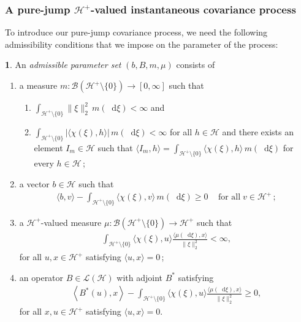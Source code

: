 \documentclass[10pt,a4paper,reqno]{amsart}
\makeatletter
\newcommand*\D{\mathop{}\!\mathrm{d}}
\numberwithin{equation}{section}
\theoremstyle{plain}
\theoremstyle{definition}
\theoremstyle{example}
\newtheorem*{assumption*}{\assumptionnumber}
\providecommand{\assumptionnumber}{}
\newenvironment{assumption}[2]
 {%
  \renewcommand{\assumptionnumber}{Assumption #1$\mathfrak{#2}$}%
  \begin{assumption*}%
  \protected@edef\@currentlabel{#1$
  \mathfrak{#2}$}%
 }
 {%
  \end{assumption*}
 }
\newcommand{\cB}{\mathcal{B}}
\newcommand{\cH}{\mathcal{H}}
\newcommand{\cHplus}{\cH^{+}}
\newcommand{\cHpluso}{\cHplus\setminus \{0\}}
\newcommand{\dm}{m(\D\xi)}
\newcommand{\dmu}{\mu(\D\xi)}
\makeatother
\begin{document}
\subsubsection{A pure-jump $\cH^+$-valued instantaneous covariance process}
To introduce our pure-jump covariance process, we need the following admissibility conditions that we impose on the parameter of the process:
\begin{assumption}{}{A}\label{def:admissibility}
 An \emph{admissible parameter set}
$(b, B, m, \mu)$ %
consists of
\begin{enumerate}
\item[(i)] \label{eq:m-2moment} a measure $m\colon\cB(\cHpluso)\to [0,\infty]$ such that
    \begin{enumerate}
    \item[(a)] $\int_{\cHpluso} \| \xi \|_2^2 \,\dm < \infty$ and
    \item[(b)] $\int_{\cHpluso}|\langle\chi(\xi),h\rangle|\,\dm<\infty$ for all $h\in\cH$  
   and there exists an element $I_{m}\in \cH$ such that $\langle
   I_{m},h\rangle=\int_{\cHpluso}\langle \chi(\xi),h\rangle\, m(\D\xi)$ for every $h\in\cH$\,;
 \end{enumerate}   
\item[(ii)]\label{eq:drift} a vector $b\in\cH$ such that
  \begin{align}\label{ass:b_positive}
    \langle b, v\rangle - \int_{\cHpluso} \langle \chi(\xi), v\rangle\,m(\D\xi) \geq 0\, \quad\text{for all}\;v\in\cHplus\,;
  \end{align}
\item[(iii)] \label{eq:affine-kernel} a $\cH^{+}$-valued measure 
$\mu \colon \mathcal{B}(\cHpluso) \rightarrow \cH^+$ such that
\begin{align*}
\int_{\cH^+\setminus \{0\}} \langle \chi(\xi), u\rangle \frac{\langle \dmu, x \rangle}{\| \xi \|_2^2 }< \infty,  
\end{align*}
for all $u,x\in \cH^{+}$ satisfying $\langle u,x \rangle = 0$\,;
 \item[(iv)] \label{eq:linear-operator} an operator $B\in \mathcal{L}(\mathcal{H})$ 
 with adjoint $B^{*}$ satisfying
\begin{align*}
    \left\langle B^{*}(u) , x \right\rangle 
    - 
    \int_{\cHpluso}
        \langle \chi(\xi),u\rangle 
        \frac{\langle \dmu, x \rangle}{\| \xi\|_2^2 }
    \geq 0,
  \end{align*}
  for all $x,u \in \cHplus$ satisfying $\langle u,x\rangle=0$.
\end{enumerate}
\end{assumption}
\end{document}
